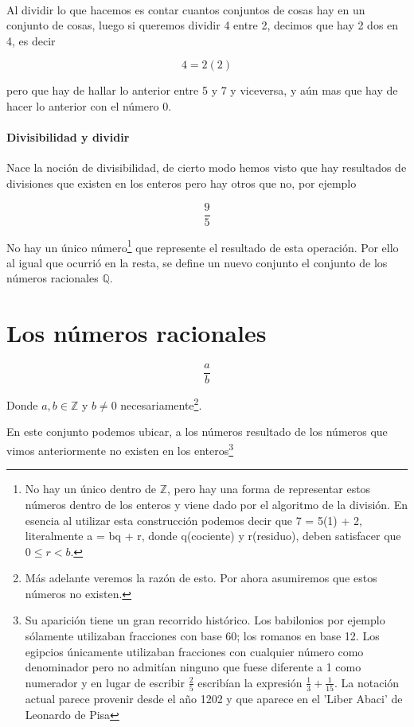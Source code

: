 \documentclass{article}
\begin{document}
\paragraph{}Al dividir lo que hacemos es contar cuantos conjuntos de cosas hay en un conjunto de cosas, luego si queremos dividir 4 entre 2, decimos que hay 2 dos en 4, es decir

$$4 = 2(2)$$

pero que hay de hallar lo anterior entre 5 y 7 y viceversa, y aún mas que hay de hacer lo anterior con el número 0.

\paragraph{Divisibilidad y dividir} Nace la noción de divisibilidad, de cierto modo hemos visto que hay resultados de divisiones que existen en los enteros pero hay otros que no, por ejemplo

$$\frac{9}{5}$$

No hay un único número\footnote{No hay un único dentro de $\mathbb{Z}$, pero hay una forma de representar estos números dentro de los enteros y viene dado por el algoritmo de la división. En esencia al utilizar esta construcción podemos decir que 7 = 5(1) + 2, literalmente a = bq + r, donde q(cociente) y r(residuo), deben satisfacer que $0 \leq r<b$.} que represente el resultado de esta operación. Por ello al igual que ocurrió en la resta, se define un nuevo conjunto el conjunto de los números racionales $\mathbb{Q}$.

\section{Los números racionales}

$$\frac{a}{b}$$

Donde $a, b \in \mathbb{Z}$ y $b \neq 0$ necesariamente\footnote{Más adelante veremos la razón de esto. Por ahora asumiremos que estos números no existen.}.

En este conjunto podemos ubicar, a los números resultado de los números que vimos anteriormente no existen en los enteros\footnote{Su aparición tiene un gran recorrido histórico. Los babilonios por ejemplo sólamente utilizaban fracciones con base 60; los romanos en base 12. Los egipcios únicamente utilizaban fracciones con cualquier número como denominador pero no admitían ninguno que fuese diferente a 1 como numerador y en lugar de escribir $\frac{2}{5}$ escribían la expresión $\frac{1}{3} + \frac{1}{15}$. La notación actual parece provenir desde el año 1202 y que aparece en el 'Liber Abaci' de Leonardo de Pisa\cite{patino_duque_1977}}
\end{document}

